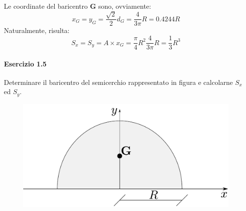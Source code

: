 Le coordinate del baricentro $\mathbf{G}$ sono, ovviamente: 
\begin{equation*}
x_G = y_G = \frac{\sqrt{2}}{2}d_G = \frac{4}{3\pi}R = 0.4244R
\end{equation*}
Naturalmente, risulta:
\begin{equation*}
S_x = S_y = A\times x_G = \frac{\pi}{4}R^2\frac{4}{3\pi}R = \frac{1}{3}R^3
\end{equation*}
\paragraph{Esercizio 1.5}
Determinare il baricentro del semicerchio rappresentato in figura e calcolarne $S_x$ ed $S_y$. 
\renewcommand{\thefigure}{1.5~-~1}
\begin{figure}[ht]
\centering
\includegraphics[width=\textwidth]{Immagini/Parte_1/Esercizio1_5/Esercizio1_5.pdf}
\caption{}
\label{Esercizio1_5}
\end{figure}

